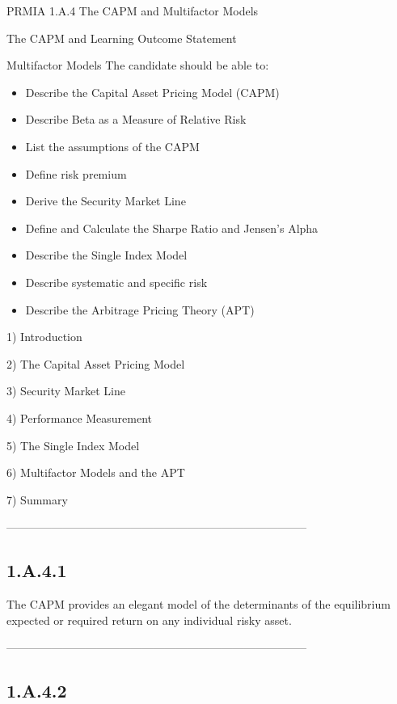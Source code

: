
PRMIA 1.A.4  The CAPM and Multifactor Models 

The CAPM and Learning Outcome Statement

Multifactor Models The candidate should be able to:
\begin{itemize}
\item Describe the Capital Asset Pricing Model (CAPM)
\item 
 Describe Beta as a Measure of Relative Risk
\item 
 List the assumptions of the CAPM
\item 
 Define risk premium
\item 
 Derive the Security Market Line
\item 
 Define and Calculate the Sharpe Ratio and Jensen’s Alpha
\item 
 Describe the Single Index Model
\item 
 Describe systematic and specific risk
\item 
 Describe the Arbitrage Pricing Theory (APT)
\end{itemize}

1) Introduction

2) The Capital Asset Pricing Model

3) Security Market Line

4) Performance Measurement

5) The Single Index Model

6) Multifactor Models and the APT

7) Summary




--------------------------------------------------------------------------------


\subsection{1.A.4.1}

The CAPM provides an elegant model of the determinants of the equilibrium expected or required return on any individual risky asset.




--------------------------------------------------------------------------------
\subsection{1.A.4.2}


